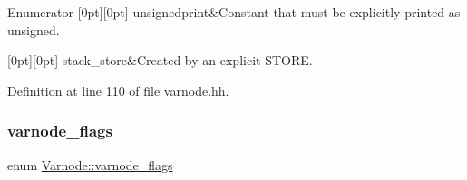 \begin{DoxyEnumFields}{Enumerator}
[0pt][0pt]{}\mbox{\label{class_varnode_a54e5d14b3fc1c7916863ba2a2d7ee900add3a6c6a8ceb360f9f6024edc4d72f80}} 
unsignedprint&Constant that must be explicitly printed as unsigned. \\
\hline

[0pt][0pt]{}\mbox{\label{class_varnode_a54e5d14b3fc1c7916863ba2a2d7ee900a08bdeb602d4ddc6dcd8c30e5769283e6}} 
stack\+\_\+store&Created by an explicit S\+T\+O\+RE. \\
\hline

\end{DoxyEnumFields}


Definition at line 110 of file varnode.\+hh.

\mbox{\label{class_varnode_ad367c0ac3c08b6f41e7334e90a138e8c}} 
\subsubsection{\texorpdfstring{varnode\_flags}{varnode\_flags}}
{\footnotesize\ttfamily enum \mbox{\hyperlink{class_varnode_ad367c0ac3c08b6f41e7334e90a138e8c}{Varnode\+::varnode\+\_\+flags}}}

